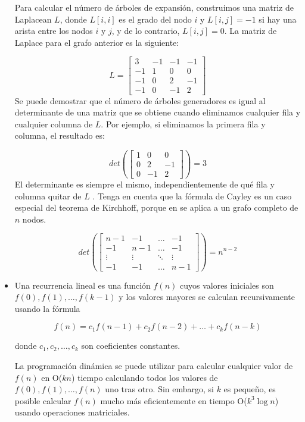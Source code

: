 \begin{itemize}
	Para calcular el número de árboles de expansión, construimos una matriz de Laplacean $L$, donde $L[i,i]$ es el grado del nodo $i$ y $L[i,j]=-1$ si hay una arista entre los nodos $i$ y $j$, y de lo contrario, $L[i,j] = 0$. La matriz de Laplace para el grafo anterior es la siguiente:
	
	$$
	L = \begin{bmatrix}
		3 & -1 & -1 & -1  \\
		-1 & 1  & 0 & 0 \\
		-1 & 0  & 2 & -1 \\
		-1 & 0  & -1 & 2
	\end{bmatrix}
$$	
	Se puede demostrar que el número de árboles generadores es igual al determinante de una matriz que se obtiene cuando eliminamos cualquier fila y cualquier columna de $L$. Por ejemplo, si eliminamos la primera fila y columna, el resultado es:
	
		$$
	det( \begin{bmatrix}
		
		 1  & 0 & 0 \\
		 0  & 2 & -1 \\
		 0  & -1 & 2
	\end{bmatrix}) = 3
	$$
	El determinante es siempre el mismo, independientemente de qué fila y columna
	quitar de $L$ . Tenga en cuenta que la fórmula de Cayley es un caso especial del teorema de Kirchhoff, porque en se aplica a un grafo completo de $n$ nodos.
	
		$$
	det(\begin{bmatrix}
		n-1 & -1 & \ldots & -1  \\
		-1 & n-1  & \ldots & -1 \\
		\vdots & \vdots  & \ddots & \vdots \\
		-1 & -1  & \ldots & n-1
	\end{bmatrix}) = n^{n-2}
	$$	
	
	\item Una recurrencia lineal es una función $f(n)$ cuyos valores iniciales son $f(0),f(1), \dots ,f(k-1)$ y los valores mayores se calculan recursivamente usando la fórmula
	
	$$f(n)= c_1f(n-1)+ c_2f(n-2) + \dots + c_kf(n-k)$$
	
	donde $c_1 , c_2 , \dots , c_k$ son coeficientes constantes.
	
	La programación dinámica se puede utilizar para calcular cualquier valor de $f(n)$ en O($kn$) tiempo calculando todos los valores de $f(0),f(1),\dots ,f(n)$ uno tras otro. Sin embargo, si $k$ es pequeño, es posible calcular $f(n)$ mucho más eficientemente en tiempo O($k^3 \log n$) usando operaciones matriciales.
	

\end{itemize}
